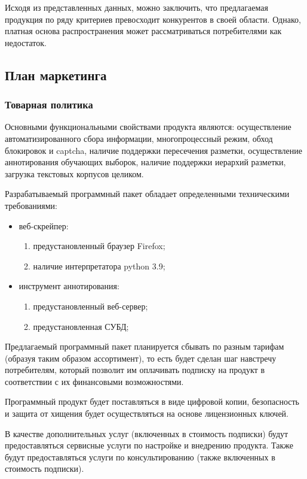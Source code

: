 \documentclass[../main]{subfiles}
\begin{document}
Исходя из представленных данных, можно заключить, что предлагаемая продукция по ряду критериев превосходит конкурентов в своей области. Однако, платная основа распространения может рассматриваться потребителями как недостаток.

\subsection{План маркетинга}

\subsubsection{Товарная политика}
Основными функциональными свойствами продукта являются: осуществление автоматизированного сбора информации, многопроцессный режим, обход блокировок и captcha, наличие поддержки пересечения разметки, осуществление аннотирования обучающих выборок, наличие поддержки иерархий разметки, загрузка текстовых корпусов целиком.

Разрабатываемый программный пакет обладает определенными техническими требованиями:
\begin{itemize}
    \item веб-скрейпер:
    \begin{enumerate}
        \item предустановленный браузер Firefox;
        \item наличие интерпретатора python 3.9;
    \end{enumerate}
    \item инструмент аннотирования:
    \begin{enumerate}
        \item предустановленный веб-сервер;
        \item предустановленная СУБД;
    \end{enumerate}
\end{itemize}

Предлагаемый программный пакет планируется сбывать по разным тарифам (образуя таким образом ассортимент), то есть будет сделан шаг навстречу потребителям, который позволит им оплачивать подписку на продукт в соответствии с их финансовыми возможностями.

Программный продукт будет поставляться в виде цифровой копии, безопасность и защита от хищения будет осуществляться на основе лицензионных ключей.

В качестве дополнительных услуг (включенных в стоимость подписки) будут предоставляться сервисные услуги по настройке и внедрению продукта. Также будут предоставляться услуги по консультированию (также включенных в стоимость подписки).
\end{document}

